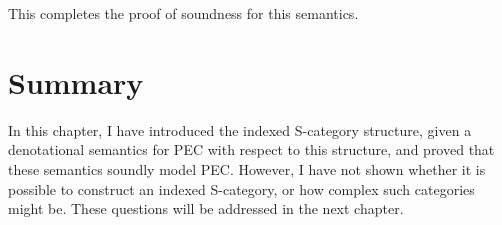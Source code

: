 This completes the proof of soundness for this semantics.

\section{Summary}

In this chapter, I have introduced the indexed S-category structure, given a denotational semantics for PEC with respect to this structure, and proved that these semantics soundly model PEC. However, I have not shown whether it is possible to construct an indexed S-category, or how complex such categories might be. These questions will be addressed in the next chapter.

